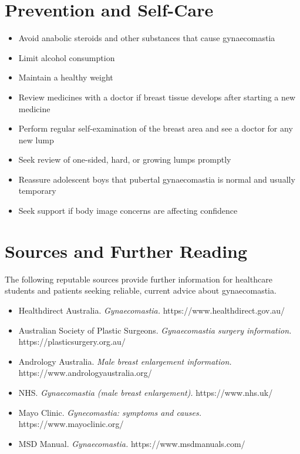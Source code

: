 \section*{Prevention and Self-Care}
\begin{itemize}
    \item Avoid anabolic steroids and other substances that cause gynaecomastia
    \item Limit alcohol consumption
    \item Maintain a healthy weight
    \item Review medicines with a doctor if breast tissue develops after starting a new medicine
    \item Perform regular self-examination of the breast area and see a doctor for any new lump
    \item Seek review of one-sided, hard, or growing lumps promptly
    \item Reassure adolescent boys that pubertal gynaecomastia is normal and usually temporary
    \item Seek support if body image concerns are affecting confidence
\end{itemize}

\section*{Sources and Further Reading}
The following reputable sources provide further information for healthcare students and patients seeking reliable, current advice about gynaecomastia.

\begin{itemize}
    \item Healthdirect Australia. \textit{Gynaecomastia.} https://www.healthdirect.gov.au/
    \item Australian Society of Plastic Surgeons. \textit{Gynaecomastia surgery information.} https://plasticsurgery.org.au/
    \item Andrology Australia. \textit{Male breast enlargement information.} https://www.andrologyaustralia.org/
    \item NHS. \textit{Gynaecomastia (male breast enlargement).} https://www.nhs.uk/
    \item Mayo Clinic. \textit{Gynecomastia: symptoms and causes.} https://www.mayoclinic.org/
    \item MSD Manual. \textit{Gynaecomastia.} https://www.msdmanuals.com/
\end{itemize}
